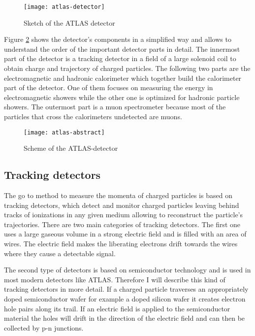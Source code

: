 \begin{figure}[h]
  \centering
  \texttt{[image: atlas-detector]}
  \caption[Sketch of the ATLAS detector]{Sketch of the ATLAS detector \cite{atlasfigures}}
  \label{fig:atlas}
\end{figure}

Figure \ref{fig:atlas_sketch} shows the detector's components in a simplified way and allows to understand the order of the important detector parts in detail. The innermost part of the detector is a tracking detector in a field of a large solenoid coil to obtain charge and trajectory of charged particles.
The following two parts are the electromagnetic and hadronic calorimeter which together build the calorimeter part of the detector. One of them focuses on measuring the energy in electromagnetic showers while the other one is optimized for hadronic particle showers. The outermost part is a muon spectrometer because most of the particles that cross the calorimeters undetected are muons.


\begin{figure}[h]
  \centering
  \texttt{[image: atlas-abstract]}
  \caption[Sketch of the transversal section of the ATLAS detector]{Scheme of the ATLAS-detector \cite{atlasfigures}}
  \label{fig:atlas_sketch}
\end{figure}

\subsection{Tracking detectors}

The go to method to measure the momenta of charged particles is based on tracking detectors, which detect and monitor charged particles leaving behind tracks of ionizations in any given medium allowing to reconstruct the particle's trajectories.
There are two main categories of tracking detectors. The first one uses a large gaseous volume in a strong electric field and is filled with an area of wires. The electric field makes the liberating electrons drift towards the wires where they cause a detectable signal.

The second type of detectors is based on semiconductor technology and is used in most modern detectors like ATLAS. Therefore I will describe this kind of tracking detectors in more detail.
If a charged particle traverses an appropriately doped semiconductor wafer for example a doped silicon wafer it creates electron hole pairs along its trail. If an electric field is applied to the semiconductor material the holes will drift in the direction of the electric field and can then be collected by p-n junctions.


